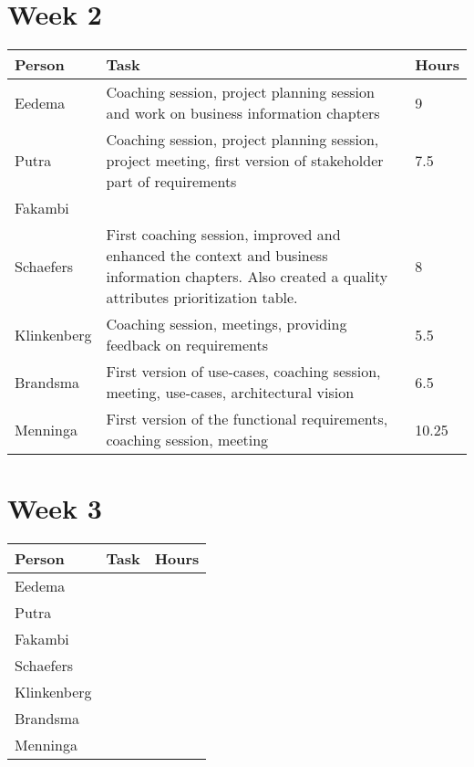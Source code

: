 \section{Week 2}
\begin{tabular}{L{0.2\textwidth} L{0.7\textwidth} L{0.1\textwidth}}
    \textbf{Person} & \textbf{Task} & \textbf{Hours} \\ \toprule
	Eedema & Coaching session, project planning session and work on business information chapters & 9  \\ \midrule
	Putra & Coaching session, project planning session, project meeting, first version of stakeholder part of requirements & 7.5 \\ \midrule
	Fakambi & & \\ \midrule
	Schaefers & First coaching session, improved and enhanced the context and business information chapters. Also created a quality attributes prioritization table.& 8 \\ \midrule
	Klinkenberg & Coaching session, meetings, providing feedback on requirements & 5.5\\ \midrule
	Brandsma & First version of use-cases, coaching session, meeting, use-cases, architectural vision & 6.5 \\ \midrule
	Menninga & First version of the functional requirements, coaching session, meeting & 10.25 \\ \bottomrule
\end{tabular}

\section{Week 3}
\begin{tabular}{p{} p{} p{}}
   \textbf{Person} & \textbf{Task} & \textbf{Hours} \\ \midrule
	Eedema &  &  \\ \midrule
	Putra &  &  \\ \midrule
	Fakambi & & \\ \midrule
	Schaefers &  & \\ \midrule
	Klinkenberg & & \\ \midrule
	Brandsma &  & \\ \midrule
	Menninga &  &  \\ \midrule
\end{tabular}